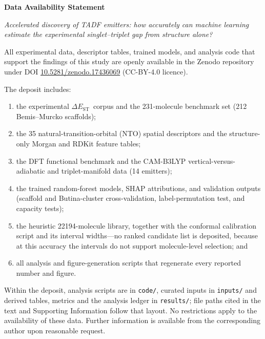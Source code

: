 \documentclass[11pt]{article}
\newcommand{\deltaest}{$\Delta E_\text{ST}$}
\newcommand{\doi}{10.5281/zenodo.17436069}
\begin{document}
{\large\bfseries\color{RSCblue} Data Availability Statement}

\vspace{0.4em}
{\small\itshape Accelerated discovery of TADF emitters: how accurately can machine
learning estimate the experimental singlet--triplet gap from structure alone?\par}

\vspace{1.0em}

All experimental data, descriptor tables, trained models, and analysis code that
support the findings of this study are openly available in the Zenodo repository under
DOI \href{https://doi.org/\doi}{\doi} (CC-BY-4.0 licence).

The deposit includes:

\begin{enumerate}[leftmargin=1.6em,itemsep=0.35em]
  \item the experimental \deltaest\ corpus and the \num{231}-molecule benchmark set
        (\num{212} Bemis--Murcko scaffolds);
  \item the \num{35} natural-transition-orbital (NTO) spatial descriptors and the
        structure-only Morgan and RDKit feature tables;
  \item the DFT functional benchmark and the CAM-B3LYP vertical-versus-adiabatic and
        triplet-manifold data (\num{14} emitters);
  \item the trained random-forest models, SHAP attributions, and validation outputs
        (scaffold and Butina-cluster cross-validation, label-permutation test, and
        capacity tests);
  \item the heuristic \num{22194}-molecule library, together with the conformal
        calibration script and its interval widths---no ranked candidate list is
        deposited, because at this accuracy the intervals do not support
        molecule-level selection; and
  \item all analysis and figure-generation scripts that regenerate every reported
        number and figure.
\end{enumerate}

Within the deposit, analysis scripts are in \texttt{code/}, curated inputs in
\texttt{inputs/} and derived tables, metrics and the analysis ledger in
\texttt{results/}; file paths cited in the text and Supporting Information follow that
layout. No restrictions apply to the availability of these data. Further information is
available from the corresponding author upon reasonable request.
\end{document}

